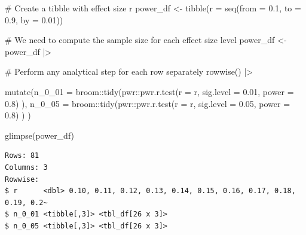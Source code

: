 \documentclass[
  letterpaper,
  DIV=11,
  numbers=noendperiod]{scrreprt}
\newenvironment{Shaded}{\begin{snugshade}}{\end{snugshade}}
\newcommand{\AttributeTok}[1]{\textcolor[rgb]{0.40,0.45,0.13}{#1}}
\newcommand{\CommentTok}[1]{\textcolor[rgb]{0.37,0.37,0.37}{#1}}
\newcommand{\FloatTok}[1]{\textcolor[rgb]{0.68,0.00,0.00}{#1}}
\newcommand{\FunctionTok}[1]{\textcolor[rgb]{0.28,0.35,0.67}{#1}}
\newcommand{\NormalTok}[1]{\textcolor[rgb]{0.00,0.23,0.31}{#1}}
\newcommand{\OtherTok}[1]{\textcolor[rgb]{0.00,0.23,0.31}{#1}}
\newcommand{\SpecialCharTok}[1]{\textcolor[rgb]{0.37,0.37,0.37}{#1}}
\begin{document}
\begin{Shaded}
\begin{Highlighting}[]
\CommentTok{\# Create a tibble with effect size r}
\NormalTok{power\_df }\OtherTok{\textless{}{-}} \FunctionTok{tibble}\NormalTok{(}\AttributeTok{r =} \FunctionTok{seq}\NormalTok{(}\AttributeTok{from =} \FloatTok{0.1}\NormalTok{,}
                           \AttributeTok{to =}  \FloatTok{0.9}\NormalTok{,}
                           \AttributeTok{by =} \FloatTok{0.01}\NormalTok{))}

\CommentTok{\# We need to compute the sample size for each effect size level}
\NormalTok{power\_df }\OtherTok{\textless{}{-}} 
\NormalTok{  power\_df }\SpecialCharTok{|\textgreater{}}
  
  \CommentTok{\# Perform any analytical step for each row separately}
  \FunctionTok{rowwise}\NormalTok{() }\SpecialCharTok{|\textgreater{}}
  
  \FunctionTok{mutate}\NormalTok{(}\AttributeTok{n\_0\_01 =}
\NormalTok{           broom}\SpecialCharTok{::}\FunctionTok{tidy}\NormalTok{(pwr}\SpecialCharTok{::}\FunctionTok{pwr.r.test}\NormalTok{(}\AttributeTok{r =}\NormalTok{ r,}
                            \AttributeTok{sig.level =} \FloatTok{0.01}\NormalTok{,}
                            \AttributeTok{power =} \FloatTok{0.8}\NormalTok{)}
\NormalTok{           ),}
         \AttributeTok{n\_0\_05 =}
\NormalTok{           broom}\SpecialCharTok{::}\FunctionTok{tidy}\NormalTok{(pwr}\SpecialCharTok{::}\FunctionTok{pwr.r.test}\NormalTok{(}\AttributeTok{r =}\NormalTok{ r,}
                            \AttributeTok{sig.level =} \FloatTok{0.05}\NormalTok{,}
                            \AttributeTok{power =} \FloatTok{0.8}\NormalTok{)}
\NormalTok{           )}
\NormalTok{         )}

\FunctionTok{glimpse}\NormalTok{(power\_df)}
\end{Highlighting}
\end{Shaded}

\begin{verbatim}
Rows: 81
Columns: 3
Rowwise: 
$ r      <dbl> 0.10, 0.11, 0.12, 0.13, 0.14, 0.15, 0.16, 0.17, 0.18, 0.19, 0.2~
$ n_0_01 <tibble[,3]> <tbl_df[26 x 3]>
$ n_0_05 <tibble[,3]> <tbl_df[26 x 3]>
\end{verbatim}
\end{document}
